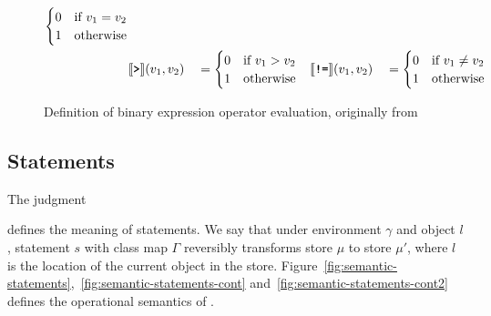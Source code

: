 \begin{figure}[ht]
\begin{align*}
\begin{cases}
            0 & \text{if}\ v_1 = v_2\\
            1 & \text{otherwise}
        \end{cases}\\
        &\llbracket\texttt{\textbf{>}}\rrbracket (v_1, v_2) &&= \begin{cases}
            0 & \text{if}\ v_1 > v_2\\ 
            1 & \text{otherwise}
        \end{cases}
        &\llbracket\texttt{\textbf{!=}}\rrbracket (v_1, v_2) &&&= \begin{cases}
            0 & \text{if}\ v_1 \not= v_2\\
            1 & \text{otherwise}
        \end{cases}
    \end{align*} 
    \caption{Definition of binary expression operator evaluation, originally from~\cite{th:roopl}}
    \label{fig:binary-operator-evaluation}
\end{figure}


\subsection{Statements}
\label{subsec:semantics-statements}
The judgment
\begin{prooftree}
\end{prooftree}
defines the meaning of statements. We say that under environment $\gamma$ and object $l$, statement $s$ with class map $\Gamma$ reversibly transforms store $\mu$ to store $\mu'$, where $l$ is the location of the current object in the store. Figure~\ref{fig:semantic-statements},~\ref{fig:semantic-statements-cont} and~\ref{fig:semantic-statements-cont2} defines the operational semantics of \rooplpp.


